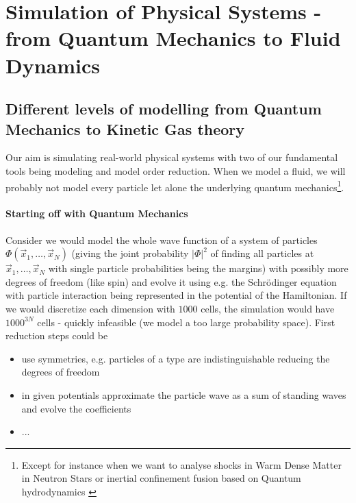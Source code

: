 \section{Simulation of Physical Systems - from Quantum Mechanics to Fluid Dynamics}
\thispagestyle{plain}
\label{sec:qm_to_fluid}

\subsection{Different levels of modelling from Quantum Mechanics to Kinetic Gas theory}
Our aim is simulating real-world physical systems with two of
our fundamental tools being modeling and model order reduction.
When we model a fluid, we will probably not model every particle
let alone the underlying quantum mechanics\footnote{Except for
instance when we want to analyse shocks in Warm Dense Matter
in Neutron Stars or inertial confinement fusion based on
Quantum hydrodynamics \citep{bonitz22}}.

\paragraph{Starting off with Quantum Mechanics} Consider we would
model the whole wave function of a system of particles $\Phi(\vec{x}_1,\dots,\vec{x}_N)$
(giving the joint probability $|\Phi|^2$ of finding all particles at $\vec{x}_1,\dots,\vec{x}_N$
with single particle probabilities being the margins)
with possibly more degrees of freedom (like spin) and evolve it using e.g. the Schrödinger equation
with particle interaction being represented in the potential of the Hamiltonian. If we would
discretize each dimension with $1000$ cells, the simulation would have $1000^{3N}$ cells - quickly
infeasible (we model a too large probability space). First reduction steps could be
\begin{itemize}
    \item use symmetries, e.g. particles of a type are indistinguishable reducing the degrees of freedom
    \item in given potentials approximate the particle wave as a sum of standing waves and evolve the coefficients
    \item ...
\end{itemize}

